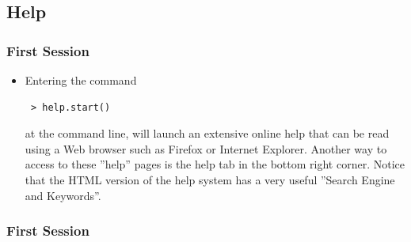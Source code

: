 \documentclass[xcolor={table},c]{beamer}
\begin{document}
\subsection{Help}
\begin{frame}[fragile]\frametitle{First Session}
\begin{itemize}
\item Entering the command
\begin{verbatim}
 > help.start()
\end{verbatim}
at the command line, will launch an extensive online help that can be read using a Web browser such as Firefox or Internet Explorer. Another way to access to these ''help'' pages is the help tab in the bottom right corner. Notice that the HTML version of the help system has a very useful ''Search Engine and Keywords''.
\end{itemize}
\end{frame}


\begin{frame}[fragile]\frametitle{First Session}
\begin{center}
\end{center}
\end{frame}
\end{document}
